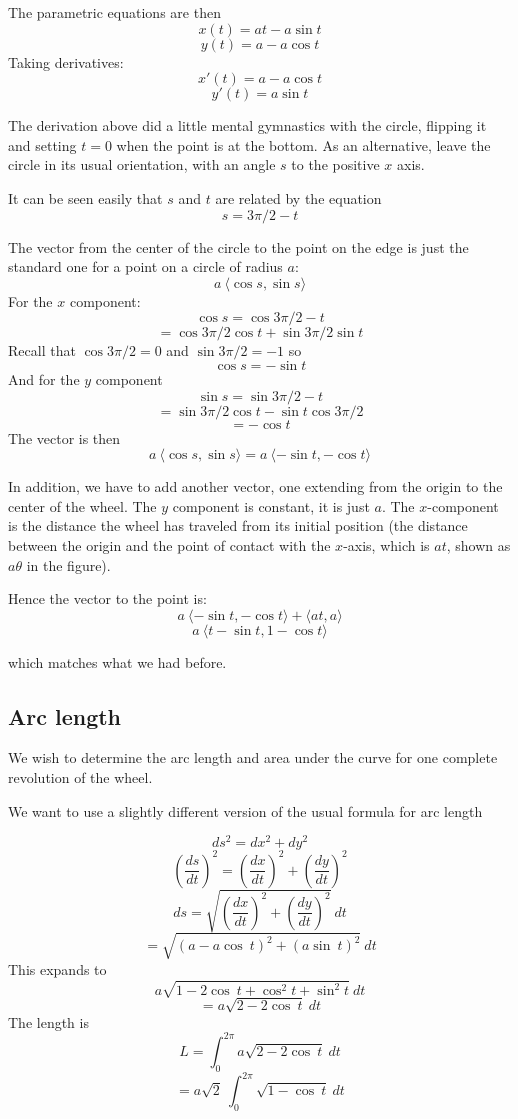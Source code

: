 \documentclass[11pt, oneside]{article}
\begin{document}
The parametric equations are then
\[ x(t) = at - a \sin t \]
\[ y(t) = a - a \cos t \]
Taking derivatives:
\[ x'(t) = a - a \cos t \]
\[ y'(t) = a \sin t  \]

The derivation above did a little mental gymnastics with the circle, flipping it and setting $t=0$ when the point is at the bottom.  As an alternative, leave the circle in its usual orientation, with an angle $s$ to the positive $x$ axis.

It can be seen easily that $s$ and $t$ are related by the equation 
\[ s = 3\pi/2 - t \]

The vector from the center of the circle to the point on the edge is just the standard one for a point on a circle of radius $a$:
\[ a \ \langle \cos s, \sin s  \rangle \]
For the $x$ component:
\[ \cos s = \cos 3 \pi / 2 - t \]
\[ = \cos 3 \pi / 2  \cos t + \sin 3 \pi / 2 \sin t \]
Recall that $\cos 3 \pi / 2 = 0$ and $\sin 3 \pi / 2 = -1$ so
\[ \cos s = - \sin t \]
And for the $y$ component
\[ \sin s = \sin 3 \pi / 2 - t \]
\[ = \sin 3 \pi / 2 \cos t - \sin t \cos  3 \pi / 2 \]
\[ = - \cos t \]
The vector is then
\[ a \ \langle \cos s, \sin s  \rangle = a \ \langle -\sin t, -\cos t  \rangle \]

In addition, we have to add another vector, one extending from the origin to the center of the wheel.  The $y$ component is constant, it is just $a$.  The $x$-component is the distance the wheel has traveled from its initial position (the distance between the origin and the point of contact with the $x$-axis, which is $at$, shown as $a \theta$ in the figure).

Hence the vector to the point is:
\[ a \ \langle -\sin t, -\cos t  \rangle + \langle at, a \rangle \]
\[ a \ \langle t - \sin t, 1 - \cos t \rangle \]

which matches what we had before.

\subsection*{Arc length}
We wish to determine the arc length and area under the curve for one complete revolution of the wheel.

We want to use a slightly different version of the usual formula for arc length

\[ ds^2 = dx^2 + dy^2 \]
\[ (\frac{ds}{dt})^2 = (\frac{dx}{dt})^2 + (\frac{dy}{dt})^2 \]
\[ ds = \sqrt{(\frac{dx}{dt})^2 + (\frac{dy}{dt})^2} \ dt \]
\[ = \sqrt{(a - a \cos\ t)^2 + (a \sin\ t)^2} \ dt  \]
This expands to
\[ a \sqrt{1 - 2 \cos\ t + \cos^2t + \sin^2t } \ dt \]
\[ =  a \sqrt{2 - 2 \cos \ t} \ dt\] 
The length is
\[ L = \int_0^{2\pi} a \sqrt{2 - 2 \cos \ t} \ dt\]
\[ = a \sqrt{2} \ \int_0^{2\pi} \sqrt{1 - \cos \ t} \ dt\]
\end{document}

